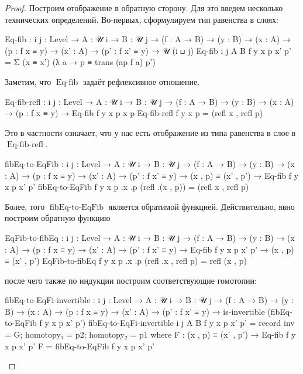 \documentclass{article}[12pt]
\newcommand{\op}{\operatorname}
\begin{document}
\begin{proof}
Построим отображение в обратную сторону. Для это введем несколько технических определений.
Во-первых, сформулируем тип равенства в слоях:
\begin{code}
Eq-fib : {i j : Level} → {A : 𝒰 i} → {B : 𝒰 j}
         → (f : A → B)
         → (y : B)
         → (x : A)
         → (p : f x ≡ y)
         → (x' : A)
         → (p' : f x' ≡ y)
         → 𝒰 (i ⊔ j)
Eq-fib {i} {j} {A} {B} f y x p x' p' = Σ (x ≡ x') (λ a → p ≡ trans (ap f a) p')
\end{code}
Заметим, что $\op{Eq-fib}$ задаёт рефлексивное отношение.
\begin{code}
Eq-fib-refl : {i j : Level} → {A : 𝒰 i} → {B : 𝒰 j}
              → (f : A → B)
              → (y : B)
              → (x : A)
              → (p : f x ≡ y)
              → Eq-fib f y x p x p
Eq-fib-refl f y x p = (refl x , refl p)
\end{code}
Это в частности означает, что у нас есть отображение из типа равенства в слое в $\op{Eq-fib-refl}$.
\begin{code}
fibEq-to-EqFib : {i j : Level} → {A : 𝒰 i} → {B : 𝒰 j}
                 → (f : A → B)
                 → (y : B)
                 → (x : A) → (p : f x ≡ y)
                 → (x' : A) → (p' : f x' ≡ y)
                 → (x , p) ≡ (x' , p')
                 → Eq-fib f y x p x' p'
fibEq-to-EqFib f y x p .x .p (refl .(x , p)) = (refl x , refl p)
\end{code}
Более, того $\op{fibEq-to-EqFib}$ является обратимой функцией. Действительно, явно построим
обратную функцию
\begin{code}
EqFib-to-fibEq : {i j : Level} → {A : 𝒰 i} → {B : 𝒰 j}
                 → (f : A → B)
                 → (y : B)
                 → (x : A) → (p : f x ≡ y)
                 → (x' : A) → (p' : f x' ≡ y)
                 → Eq-fib f y x p x' p'
                 → (x , p) ≡ (x' , p')
EqFib-to-fibEq f y x p .x .p (refl .x , refl p) = refl (x , p)
\end{code}
после чего также по индукции построим соответствующие гомотопии:
\begin{code}
fibEq-to-EqFi-invertible : {i j : Level} → {A : 𝒰 i} → {B : 𝒰 j}
                           → (f : A → B)
                           → (y : B)
                           → (x : A) → (p : f x ≡ y)
                           → (x' : A) → (p' : f x' ≡ y)
                           → is-invertible (fibEq-to-EqFib f y x p x' p')
fibEq-to-EqFi-invertible {i} {j} {A} {B} f y x p x' p' = 
    record {inv = G;
            homotopy₁ = p2;
            homotopy₂ = p1}
    where
        F : (x , p) ≡ (x' , p') → Eq-fib f y x p x' p'
        F = fibEq-to-EqFib f y x p x' p'


\end{code}
\end{proof}
\end{document}
